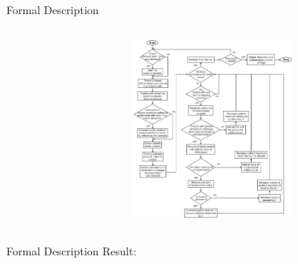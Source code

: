 \documentclass[12pt, notes=show]{beamer}
\begin{document}
\begin{frame}{Formal Description}
{\begin{center}
\begin{columns}
\begin{column}{.4\textwidth}
		    \end{column}
		    \begin{column}{.4\textwidth}

		\includegraphics[height=6cm]{images/formalModel.png}
		    \end{column}
		\end{columns}
	    \end{center}
    }

\end{frame}
\begin{frame}{Formal Description}
	Result:\\
	\begin{center}

	\end{center}

\end{frame}
\end{document}

